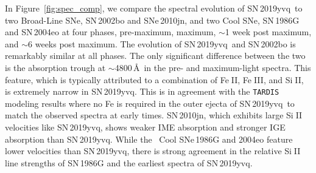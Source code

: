 \documentclass[twocolumn]{aastex63}
\def\ion#1#2{#1$\;${\footnotesize\rm{#2}}\relax}
\newcommand{\sn}{SN\,2019yvq}
\begin{document}
In Figure~\ref{fig:spec_comp}, we compare the spectral evolution of \sn\ to
two Broad-Line SNe, SN\,2002bo and SNe\,2010jn, and two Cool SNe, SN\,1986G
and SN\,2004eo \citep{Cristiani92,
Benetti04,Pastorello07,Silverman11,Hachinger13,Maguire14} at four phases,
pre-maximum, maximum, $\sim$1 week post maximum, and $\sim$6 weeks post
maximum. The evolution of \sn\ and SN\,2002bo is remarkably similar at all
phases. The only significant difference between the two is the absorption
trough at $\sim$4800\,\AA\ in the pre- and maximum-light spectra. This
feature, which is typically attributed to a combination of \ion{Fe}{II},
\ion{Fe}{III}, and \ion{Si}{II}, is extremely narrow in \sn. This is in
agreement with the \texttt{TARDIS} modeling results where no Fe is required
in the outer ejecta of \sn\ to match the observed spectra at early times.
SN\,2010jn, which exhibits large \ion{Si}{II} velocities like \sn, shows
weaker IME absorption and stronger IGE absorption than \sn. While the
\citeauthor{Branch06}~Cool SNe\,1986G and 2004eo feature lower velocities than
\sn, there is strong agreement in the relative \ion{Si}{II} line strengths of
SN\,1986G and the earliest spectra of \sn.

\end{document}
